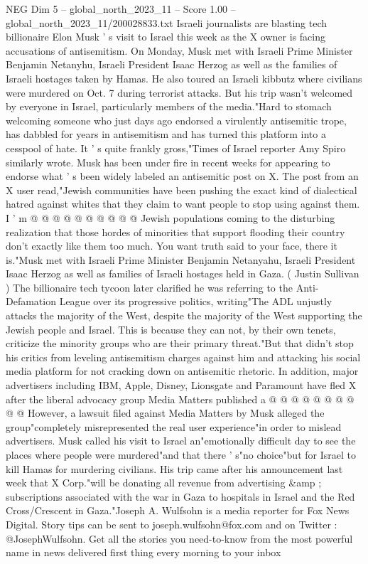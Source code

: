 \begin{textsample}{NEG Dim 5 – global\_north\_2023\_11 – Score 1.00 – global\_north\_2023\_11/200028833.txt}  \label{ex:f5_neg_035}
Israeli journalists are blasting tech billionaire Elon Musk ' s visit to Israel this week as the X owner is facing accusations of antisemitism.
On Monday, Musk met with Israeli Prime Minister Benjamin Netanyhu, Israeli President Isaac Herzog as well as the families of Israeli hostages taken by Hamas.
He also toured an Israeli kibbutz where civilians were murdered on Oct. 7 during terrorist attacks.
But his trip wasn't welcomed by everyone in Israel, particularly members of the media."Hard to stomach welcoming someone who just days ago endorsed a virulently antisemitic trope, has dabbled for years in antisemitism and has turned this platform into a cesspool of hate.
It ' s quite frankly gross,"Times of Israel reporter Amy Spiro similarly wrote.
Musk has been under fire in recent weeks for appearing to endorse what ' s been widely labeled an antisemitic post on X.
The post from an X user read,"Jewish communities have been pushing the exact kind of dialectical hatred against whites that they claim to want people to stop using against them.
I ' m @ @ @ @ @ @ @ @ @ @ Jewish populations coming to the disturbing realization that those hordes of minorities that support flooding their country don't exactly like them too much.
You want truth said to your face, there it is."Musk met with Israeli Prime Minister Benjamin Netanyahu, Israeli President Isaac Herzog as well as families of Israeli hostages held in Gaza. ( Justin Sullivan ) The billionaire tech tycoon later clarified he was referring to the Anti-Defamation League over its progressive politics, writing"The ADL unjustly attacks the majority of the West, despite the majority of the West supporting the Jewish people and Israel.
This is because they can not, by their own tenets, criticize the minority groups who are their primary threat."But that didn't stop his critics from leveling antisemitism charges against him and attacking his social media platform for not cracking down on antisemitic rhetoric.
In addition, major advertisers including IBM, Apple, Disney, Lionsgate and Paramount have fled X after the liberal advocacy group Media Matters published a @ @ @ @ @ @ @ @ @ @ However, a lawsuit filed against Media Matters by Musk alleged the group"completely misrepresented the real user experience"in order to mislead advertisers.
Musk called his visit to Israel an"emotionally difficult day to see the places where people were murdered"and that there ' s"no choice"but for Israel to kill Hamas for murdering civilians.
His trip came after his announcement last week that X Corp."will be donating all revenue from advertising \&amp ; subscriptions associated with the war in Gaza to hospitals in Israel and the Red Cross/Crescent in Gaza."Joseph A.
Wulfsohn is a media reporter for Fox News Digital.
Story tips can be sent to joseph.wulfsohn@fox.com and on Twitter : @JosephWulfsohn.
Get all the stories you need-to-know from the most powerful name in news delivered first thing every morning to your inbox

\end{textsample}
